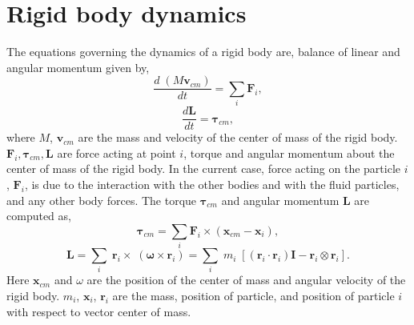 \documentclass[preprint,12pt]{elsarticle}
\newcommand{\teng}[1]{\ensuremath{\boldsymbol{#1}}}
\newcommand{\ten}[1]{\ensuremath{\mathbf{#1}}}
\begin{document}
\section{Rigid body dynamics}
\label{sec:rbd}
The equations governing the dynamics of a rigid body are, balance of linear and
angular momentum given by,
\begin{equation}
  \label{eq:rfc:balance_linear_mom}
  \frac{d \; (M \ten{v}_{cm})}{d t} = \sum_i \ten{F}_i,
\end{equation}
\begin{equation}
  \label{eq:rfc:balance_angular_mom}
  \frac{d \ten{L}}{d t} = \teng{\tau}_{cm},
\end{equation}
where $M$, $\ten{v}_{cm}$ are the mass and velocity of the center of mass of the rigid body.
$\ten{F}_i, \teng{\tau}_{cm}, \ten{L} $ are force acting at point $i$, torque and
angular momentum about the center of mass of the rigid body. In the current
case, force acting on the particle $i$, $\ten{F}_i$, is due to the interaction
with the other bodies and with the fluid particles, and any other body forces.
The torque $\teng{\tau}_{cm}$ and angular momentum $\ten{L}$ are computed as,
\begin{equation}
  \label{eq:rfc:torque}
 \teng{\tau}_{cm} = \sum_i \ten{F}_i \times (\ten{x}_{cm} - \ten{x}_{i}),
\end{equation}
\begin{equation}
  \label{eq:rfc:moi}
  \teng{L} =
  \sum_i \; \ten{r}_i \times \; (\teng{\omega} \times \ten{r}_i)
  = \sum_i \; m_i \; [(\ten{r}_i \cdot \ten{r}_i) \ten{I} - \ten{r}_i \otimes \ten{r}_i].
\end{equation}
Here $\ten{x}_{cm}$ and $\omega$ are the position of the center of mass and
angular velocity of the rigid body. $m_i$, $\ten{x}_{i}$, $\ten{r}_i$ are the
mass, position of particle, and position of particle $i$ with respect to vector
center of mass.
\end{document}
